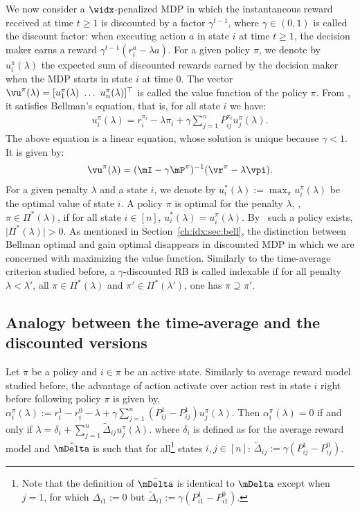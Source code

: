 We now consider a $\widx$-penalized MDP in which the instantaneous reward received at time $t\ge1$ is discounted by a factor $\gamma^{t-1}$, where $\gamma\in(0,1)$ is called the discount factor: when executing action $a$ in state $i$ at time $t\ge1$, the decision maker earns a reward $\gamma^{t-1} (r^a_i - \lambda a)$. For a given policy $\pi$, we denote by $u^\pi_i(\lambda)$ the expected sum of discounted rewards earned by the decision maker when the MDP starts in state $i$ at time $0$. The vector $\vu^\pi(\lambda)=[u^\pi_1(\lambda)\ \dots\ u^\pi_n(\lambda)]^\top$ is called the value function of the policy $\pi$. From \cite{puterman2014markov}, it satisfies Bellman's equation, that is, for all state $i$ we have: 
\begin{align}
    \label{eq:u^pi_discounted}
    u^\pi_i(\lambda) = r_i^{\pi_i} - \lambda \pi_i + \gamma \sum_{j=1}^n P^{\pi_i}_{ij} u^\pi_j(\lambda).
\end{align}
The above equation is a linear equation, whose solution is unique because $\gamma<1$. It is given by:
\begin{align}
    \label{eq:h is linear discounted}
    \vu^\pi(\lambda) = (\mI - \gamma \mP^\pi)^{-1}(\vr^{\pi} - \lambda \vpi).
\end{align}
For a given penalty $\lambda$ and a state $i$, we denote by $u^*_i(\lambda):=\max_\pi u^\pi_i(\lambda)$ be the optimal value of state $i$.  A policy $\pi$ is optimal for the penalty $\lambda$, \ie, $\pi\in\Pi^*(\lambda)$, if for all state $i\in[n]$, $u^*_i(\lambda)=u^\pi_i(\lambda)$. By~\cite{puterman2014markov} such a policy exists, $\lvert\Pi^*(\lambda)\rvert >0$.
As mentioned in Section~\ref{ch:idx:sec:bell}, the distinction between Bellman optimal and gain optimal disappears in discounted MDP in which we are concerned with maximizing the value function.
Similarly to the time-average criterion studied before, a $\gamma$-discounted RB is called indexable if for all penalty $\lambda<\lambda'$, all $\pi\in\Pi^*(\lambda)$ and $\pi'\in\Pi^*(\lambda')$, one has $\pi\supseteq\pi'$.

\subsection{Analogy between the time-average and the discounted versions}

Let $\pi$ be a policy and $i\in\pi$ be an active state.
Similarly to average reward model studied before, the advantage of action activate over action rest in state $i$ right before following policy $\pi$ is given by,
$\alpha^\pi_i(\lambda):=r^1_i -r^0_i -\lambda +\gamma\sum_{j=1}^n (P^1_{ij} -P^1_{ij})u^\pi_j(\lambda)$.
Then $\alpha^\pi_i(\lambda)=0$ if and only if $\lambda = \delta_i + \sum_{j=1}^n\tilde{\Delta}_{ij} u_j^\pi(\lambda)$. 
where $\delta_i$ is defined as for the average reward model and $\tilde{\mDelta}$ is such that for all\footnote{Note that the definition of $\tilde{\mDelta}$ is identical to $\mDelta$ except when $j=1$, for which $\Delta_{i1}:=0$ but $\tilde{\Delta}_{i1}:=\gamma(P^1_{i1}-P^0_{i1})$.} states $i,j\in[n]$: $\tilde{\Delta}_{ij}:=\gamma(P^1_{ij}-P^0_{ij})$.

